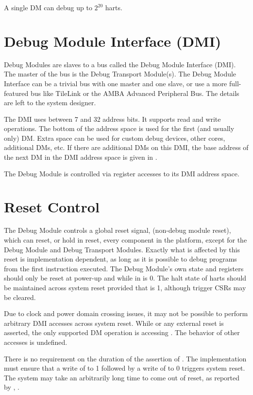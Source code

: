 A single DM can debug up to $2^{20}$ harts.

\section{Debug Module Interface (DMI)} \label{dmi}

Debug Modules are slaves to a bus called the Debug Module Interface (DMI). The
master of the bus is the Debug Transport Module(s).
The Debug Module Interface can be a trivial bus with one master and one slave,
or use a more full-featured bus like TileLink or the AMBA Advanced Peripheral
Bus. The details are left to the system designer.

The DMI uses between 7 and 32 address bits.  It supports read and write
operations.  The bottom of the address space is
used for the first (and usually only) DM. Extra space can be used for custom
debug devices, other cores, additional DMs, etc. If there are additional DMs
on this DMI, the base address of the next DM in the DMI address space is given
in \Rnextdm.


The Debug Module is controlled via register accesses to its DMI address space.

\section{Reset Control} \label{reset}

The Debug Module controls a global reset signal, \Fndmreset
(non-debug module reset),
which can reset, or hold in reset, every component in the platform,
except for the Debug Module and Debug Transport Modules.
Exactly what is affected by this reset is implementation dependent, as long as
it is possible to debug programs from the first instruction executed.
The Debug Module's own state and registers should only be
reset at power-up and while
\Fdmactive in \Rdmcontrol is 0.
The halt state of harts should be
maintained across system reset provided that \Fdmactive is 1,
although trigger CSRs may be cleared.

Due to clock and power domain crossing issues,
it may not be possible to perform arbitrary DMI accesses across
system reset.
While \Fndmreset or any external reset is asserted, the only supported DM
operation is accessing \Rdmcontrol. The behavior of other accesses is
undefined.

There is no requirement on the duration of the assertion of \Fndmreset.
The implementation must ensure that a write of \Fndmreset to 1 followed by
a write of \Fndmreset to 0 triggers system reset. The system may take
an arbitrarily long time to come out of reset, as reported by \Fallunavail,
\Fanyunavail.

